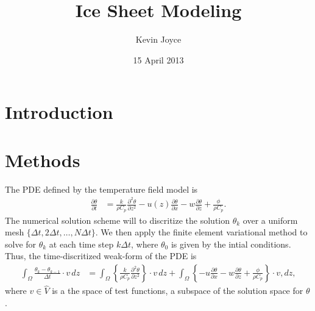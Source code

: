\documentclass[12pt]{amsart}
\title{Ice Sheet Modeling}
\author{Kevin Joyce}
\date{15 April 2013}
\begin{document}
\maketitle
\section{Introduction}

\section{Methods}
The PDE defined by the temperature field model is
\begin{align}
  \frac{\partial \theta}{\partial t} &= \frac{k}{\rho C_p} \frac{\partial^2 \theta}{\partial z^2} - u(z)\frac{\partial \theta}{\partial x} - w \frac{\partial \theta}{\partial z} + \frac{\phi}{\rho C_p}.
\end{align}
The numerical solution scheme will to discritize the solution $\theta_k$ over a uniform mesh $\{\Delta t,2\Delta t,\dots,N\Delta t\}$.  We then apply the finite element variational method to solve for $\theta_k$ at each time step $k\Delta t$, where $\theta_0$ is given by the intial conditions.  Thus, the time-discritized weak-form of the PDE is
\begin{align*}
  \int_\Omega \frac{\theta_k - \theta_{k-1}}{ \Delta t} \cdot v\, dz 
  &= \int_\Omega \left\{ \frac{k}{\rho C_p} \frac{\partial^2 \theta}{\partial z^2}\right\} \cdot v\, dz
  + \int_\Omega \left\{-u\frac{\partial \theta}{\partial x} - w \frac{\partial \theta}{\partial z} + \frac{\phi}{\rho C_p} \right\} \cdot v, dz,
\end{align*}
where $v\in \widehat V$ is a the space of test functions, a subspace of the solution space for $\theta$.
\end{document}
